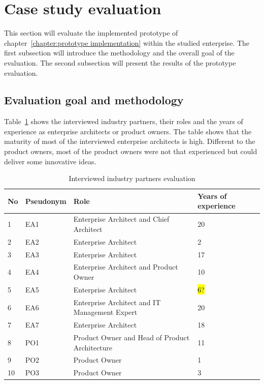 \section{Case study evaluation}\label{section:solutionarchitecture}

This section will evaluate the implemented prototype of chapter~\ref{chapter:prototype implementation} within the studied enterprise. The first subsection will introduce the methodology and the overall goal of the evaluation. The second subsection will present the results of the prototype evaluation.

\subsection{Evaluation goal and methodology}


Table~\ref{tab:interviewedindustrypartners} shows the interviewed industry partners, their roles and the years of experience as enterprise architects or product owners. The table shows that the maturity of most of the interviewed enterprise architects is high. Different to the product owners, most of the product owners were not that experienced but could deliver some innovative ideas.

\begin{table}[htpb]
  \caption[Interviewed industry partners evaluation]{Interviewed industry partners evaluation}\label{tab:interviewedindustrypartners}
  \centering
  \begin{tabular}{l l l l}
    \toprule
      No & Pseudonym & Role & Years of experience\\
    \midrule
      1 & EA1 & Enterprise Architect and Chief Architect & 20\\ %
      2 & EA2 & Enterprise Architect & 2\\ %
      3 & EA3 & Enterprise Architect & 17\\ %
      4 & EA4 & Enterprise Architect and Product Owner & 10\\ %
      5 & EA5 & Enterprise Architect & \hl{6?} \\ %
      6 & EA6 & Enterprise Architect and IT Management Expert & 20\\ %
      7 & EA7 & Enterprise Architect & 18\\ %
      8 & PO1 & Product Owner and Head of Product Architecture & 11\\ %
      9 & PO2 & Product Owner& 1 \\ %
      10 & PO3 & Product Owner& 3 \\ %
    \bottomrule
  \end{tabular}
\end{table}

